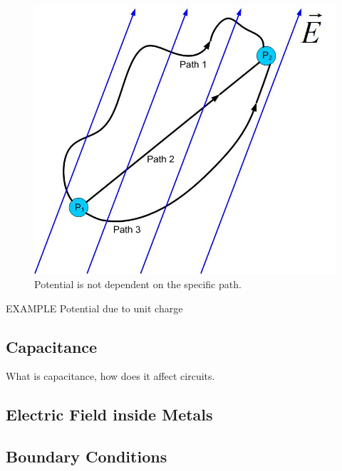 \documentclass{ximera}
\begin{document}
\begin{figure}[htbp]
\begin{center}
\includegraphics[scale=0.5]{../jpg/workindependentofpath.jpg}
\end{center}
\caption{Potential is not dependent on the specific path.}
\label{PotentialWork}
\end{figure}








{\large EXAMPLE} Potential due to unit charge





\subsection{Capacitance}
What is capacitance, how does it affect circuits.

\subsection{Electric Field inside Metals}


\subsection{Boundary Conditions}
\end{document}
